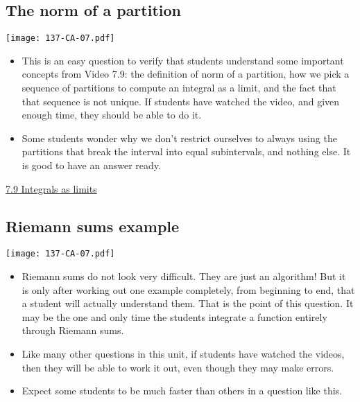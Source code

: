 \documentclass[11pt]{article}
\newcommand{\nl}{\hfill \vspace{-1.1\baselineskip}} %
\newcommand{\vix}{\hspace{8mm} \href{https://www.youtube.com/watch?v=l_iMH_naiTo&list=PLlwePzQY_wW9vqCkUudCmoOvnNmr9vMuJ&index=9}{7.9 Integrals as limits}}
\begin{document}
\newpage
\subsection{The norm of a partition}

\begin{center}
{ \texttt{[image: 137-CA-07.pdf]}} 
\end{center}

\begin{comments}
\nl
	\begin{itemize}
		\item  This is an easy question to verify that students understand some important concepts from Video 7.9: the definition of norm of a partition, how we pick a sequence of partitions to compute an integral as a limit, and the fact that that sequence is not unique.  If students have watched the video, and given enough time, they should be able to do it.
		\item  Some students wonder why we don't restrict ourselves to always using the partitions that break the interval into equal subintervals, and nothing else.  It is good to have an answer ready.
	\end{itemize}
\end{comments}

\begin{videos}
\vix
\end{videos}

\newpage
\subsection{Riemann sums example}

\begin{center}
{ \texttt{[image: 137-CA-07.pdf]}} 
\end{center}

\begin{comments}
\nl
	\begin{itemize}
		\item Riemann sums do not look very difficult.  They are just an algorithm!  But it is only after working out one example completely, from beginning to end, that a student will actually understand them.  That is the point of this question.  It may be the one and only time the students integrate a function entirely through Riemann sums.
		\item Like many other questions in this unit, if students have watched the videos, then they will be able to work it out, even though they may make errors. 
		\item Expect some students to be much faster than others in a question like this. 
	\end{itemize}
\end{comments}
\end{document}

